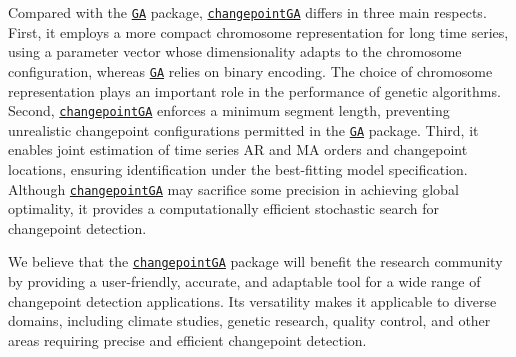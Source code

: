 Compared with the \href{https://CRAN.R-project.org/package=GA}{\texttt{GA}} package, \href{https://CRAN.R-project.org/package=changepointGA}{\texttt{changepointGA}} differs in three main respects. First, it employs a more compact chromosome representation for long time series, using a parameter vector whose dimensionality adapts to the chromosome configuration, whereas \href{https://CRAN.R-project.org/package=GA}{\texttt{GA}} relies on binary encoding. The choice of chromosome representation plays an important role in the performance of genetic algorithms. Second, \href{https://CRAN.R-project.org/package=changepointGA}{\texttt{changepointGA}} enforces a minimum segment length, preventing unrealistic changepoint configurations permitted in the \href{https://CRAN.R-project.org/package=GA}{\texttt{GA}} package. Third, it enables joint estimation of time series AR and MA orders and changepoint locations, ensuring identification under the best-fitting model specification. Although \href{https://CRAN.R-project.org/package=changepointGA}{\texttt{changepointGA}} may sacrifice some precision in achieving global optimality, it provides a computationally efficient stochastic search for changepoint detection.

We believe that the \href{https://CRAN.R-project.org/package=changepointGA}{\texttt{changepointGA}} package will benefit the research community by providing a user-friendly, accurate, and adaptable tool for a wide range of changepoint detection applications. Its versatility makes it applicable to diverse domains, including climate studies, genetic research, quality control, and other areas requiring precise and efficient changepoint detection.



\address{%
Mo Li\\
University of Louisiana at Lafayette\\%
Department of Mathematics\\ 217 Maxim Doucet Hall, Lafayette, LA 70504,\\ United States of America\\
%
%
%
\href{mailto:mo.li@louisiana.edu}{\nolinkurl{mo.li@louisiana.edu}}%
}

\address{%
QiQi Lu\\
Virginia Commonwealth University\\%
Department of Statistical Sciences and Operations Research\\ PO Box 843083, 1015 Floyd Ave., Richmond, VA 23284,\\ United States of America\\
%
%
%
\href{mailto:qlu2@vcu.edu}{\nolinkurl{qlu2@vcu.edu}}%
}
